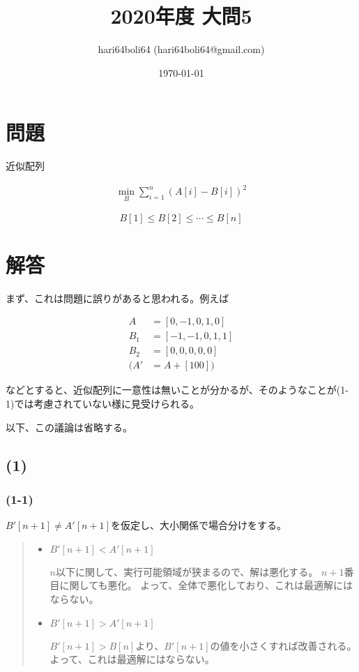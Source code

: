 \documentclass[a4paper, 10pt, dvipdfmx]{jlreq}
\begin{document}
\title{2020年度 大問5}
\author{hari64boli64 (hari64boli64@gmail.com)}
\date{\today}
\maketitle


\section{問題}

近似配列

\begin{align*}
  \min_{B} \sum_{i=1}^{n}{(A[i]-B[i])^2}
\end{align*}

$$
  B[1]\leq B[2] \leq \cdots \leq B[n]
$$

\section{解答}

まず、これは問題に誤りがあると思われる。例えば

\begin{align*}
  A   & =[0,-1,0,1,0]  \\
  B_1 & =[-1,-1,0,1,1] \\
  B_2 & =[0,0,0,0,0]   \\
  (A' & =A+[100])
\end{align*}

などとすると、近似配列に一意性は無いことが分かるが、そのようなことが(1-1)では考慮されていない様に見受けられる。

以下、この議論は省略する。

\subsection*{(1)}

\subsubsection*{(1-1)}

$B'[n+1] \neq A'[n+1]$を仮定し、大小関係で場合分けをする。

\begin{quote}
  \begin{itemize}
    \item  $B'[n+1] < A'[n+1]$

          $n$以下に関して、実行可能領域が狭まるので、解は悪化する。
          $n+1$番目に関しても悪化。
          よって、全体で悪化しており、これは最適解にはならない。

    \item  $B'[n+1] > A'[n+1]$

          $B'[n+1]>B[n]$より、$B'[n+1]$の値を小さくすれば改善される。
          よって、これは最適解にはならない。
  \end{itemize}
\end{quote}
\end{document}
